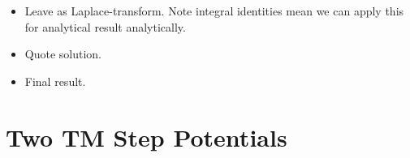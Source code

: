 \begin{itemize}
  \item {Leave as Laplace-transform.  Note integral identities mean we can apply this for analytical
    result analytically.  }
    \item Quote solution.  
  \item Final result.  
\end{itemize}


\section{Two TM Step Potentials}

